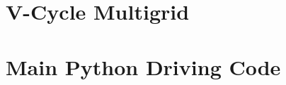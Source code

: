 \begin{appendices}
    \pagebreak
    \section{V-Cycle Multigrid}
    

    \pagebreak
    \section{Main Python Driving Code}
    

\end{appendices}